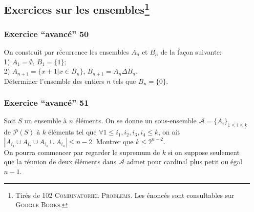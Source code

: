 \documentclass{article}
\begin{document}
\subsection{Exercices sur les ensembles\protect\footnote{Tir\'es de \textsc{102 Combinatoriel Problems}. Les \'enonc\'es sont consultables sur \textsc{Google Books}.}}

\subsubsection{Exercice ``avanc\'e'' 50}
On construit par r\'ecurrence les ensembles $A_n$ et $B_n$ de la fa\c con suivante:\\
1) $A_1=\emptyset$, $B_1=\{1\}$;\\
2) $A_{n+1}=\{x+1|x\in B_n\}$, $B_{n+1}=A_n\Delta B_n$.\\
D\'eterminer l'ensemble des entiers $n$ tels que $B_n=\{0\}$.

\subsubsection{Exercice ``avanc\'e'' 51}
Soit $S$ un ensemble \`a $n$ \'el\'ements. On se donne un sous-ensemble $\mathcal{A}=\{A_{i}\}_{1\leq i\leq k}$ de $\mathcal{P}(S)$ \`a $k$ \'el\'ements tel que $\forall 1\leq i_1,i_2,i_3,i_4\leq k$, on ait $|A_{i_1}\cup A_{i_2}\cup A_{i_3}\cup A_{i_4}|\leq n-2$. Montrer que $k\leq 2^{n-2}$.\\
On pourra commencer par regarder le supremum de $k$ si on suppose seulement que la r\'eunion de deux \'el\'ements dans $\mathcal{A}$ admet pour cardinal plus petit ou \'egal $n-1$.
\end{document}
